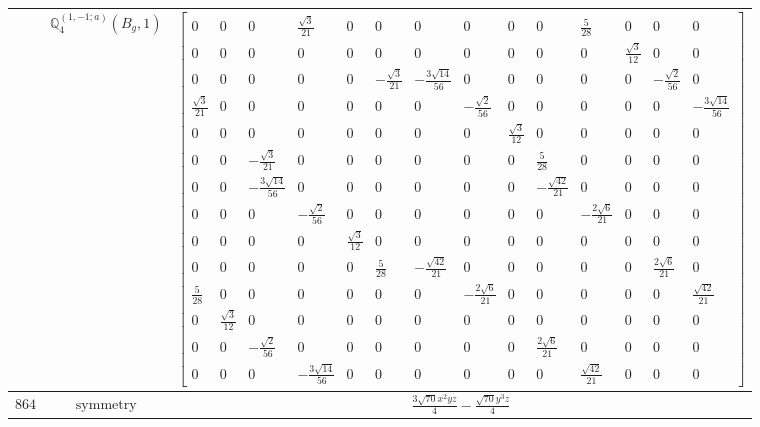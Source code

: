 \documentclass[fleqn,8pt,landscape]{jsarticle}
\begin{document}
\begin{longtable}{ccc}
$  $ & $ \mathbb{Q}_{4}^{(1,-1;a)}(B_{g},1) $ & $ \begin{bmatrix} 0 & 0 & 0 & \frac{\sqrt{3}}{21} & 0 & 0 & 0 & 0 & 0 & 0 & \frac{5}{28} & 0 & 0 & 0 \\ 0 & 0 & 0 & 0 & 0 & 0 & 0 & 0 & 0 & 0 & 0 & \frac{\sqrt{3}}{12} & 0 & 0 \\ 0 & 0 & 0 & 0 & 0 & - \frac{\sqrt{3}}{21} & - \frac{3 \sqrt{14}}{56} & 0 & 0 & 0 & 0 & 0 & - \frac{\sqrt{2}}{56} & 0 \\ \frac{\sqrt{3}}{21} & 0 & 0 & 0 & 0 & 0 & 0 & - \frac{\sqrt{2}}{56} & 0 & 0 & 0 & 0 & 0 & - \frac{3 \sqrt{14}}{56} \\ 0 & 0 & 0 & 0 & 0 & 0 & 0 & 0 & \frac{\sqrt{3}}{12} & 0 & 0 & 0 & 0 & 0 \\ 0 & 0 & - \frac{\sqrt{3}}{21} & 0 & 0 & 0 & 0 & 0 & 0 & \frac{5}{28} & 0 & 0 & 0 & 0 \\ 0 & 0 & - \frac{3 \sqrt{14}}{56} & 0 & 0 & 0 & 0 & 0 & 0 & - \frac{\sqrt{42}}{21} & 0 & 0 & 0 & 0 \\ 0 & 0 & 0 & - \frac{\sqrt{2}}{56} & 0 & 0 & 0 & 0 & 0 & 0 & - \frac{2 \sqrt{6}}{21} & 0 & 0 & 0 \\ 0 & 0 & 0 & 0 & \frac{\sqrt{3}}{12} & 0 & 0 & 0 & 0 & 0 & 0 & 0 & 0 & 0 \\ 0 & 0 & 0 & 0 & 0 & \frac{5}{28} & - \frac{\sqrt{42}}{21} & 0 & 0 & 0 & 0 & 0 & \frac{2 \sqrt{6}}{21} & 0 \\ \frac{5}{28} & 0 & 0 & 0 & 0 & 0 & 0 & - \frac{2 \sqrt{6}}{21} & 0 & 0 & 0 & 0 & 0 & \frac{\sqrt{42}}{21} \\ 0 & \frac{\sqrt{3}}{12} & 0 & 0 & 0 & 0 & 0 & 0 & 0 & 0 & 0 & 0 & 0 & 0 \\ 0 & 0 & - \frac{\sqrt{2}}{56} & 0 & 0 & 0 & 0 & 0 & 0 & \frac{2 \sqrt{6}}{21} & 0 & 0 & 0 & 0 \\ 0 & 0 & 0 & - \frac{3 \sqrt{14}}{56} & 0 & 0 & 0 & 0 & 0 & 0 & \frac{\sqrt{42}}{21} & 0 & 0 & 0 \end{bmatrix} $ \\ \hline
$ 864 $ & $ \text{symmetry} $ & $ \frac{3 \sqrt{70} x^{2} y z}{4} - \frac{\sqrt{70} y^{3} z}{4} $ \\

\end{longtable}
\end{document}
